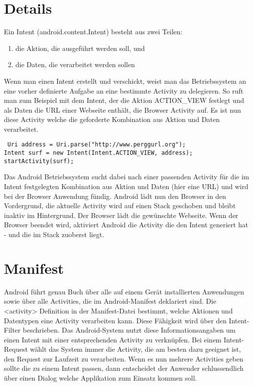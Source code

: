 \documentclass[a4paper,10pt,titlepage=false]{scrreprt}
\begin{document}
\section{Details}
Ein Intent (android.content.Intent) besteht aus zwei Teilen:
\begin{enumerate}


\item die Aktion, die ausgeführt werden soll, und
\item die Daten, die verarbeitet werden sollen
\end{enumerate}
Wenn man einen Intent erstellt und verschickt, weist man das Betriebssystem an eine vorher
definierte Aufgabe an eine bestimmte Activity zu delegieren. So ruft man zum Beispiel mit dem
Intent, der die Aktion ACTION\_VIEW festlegt und als Daten die URL einer Webseite enthält, die
Browser Activity auf. Es ist nun diese Activity welche die geforderte Kombination aus Aktion und
Daten verarbeitet.
\begin{lstlisting}
 Uri address = Uri.parse("http://www.perggurl.org");
Intent surf = new Intent(Intent.ACTION_VIEW, address);
startActivity(surf);
\end{lstlisting}
\begin{framed}
 Das Android Betriebssystem sucht dabei nach einer passenden Activity für die im Intent festgelegten
Kombination aus Aktion und Daten (hier eine URL) und wird bei der Browser Anwendung fündig.
Android lädt nun den Browser in den Vordergrund, die aktuelle Activity wird auf einen Stack
geschoben und bleibt inaktiv im Hintergrund. Der Browser lädt die gewünschte Webseite. Wenn der
Browser beendet wird, aktiviert Android die Activity die den Intent generiert hat - und die im Stack
zuoberst liegt.
\end{framed}

\section{Manifest}
Android führt genau Buch über alle auf einem Gerät installierten Anwendungen sowie über alle
Activities, die im Android-Manifest deklariert sind. Die <activity> Definition in der Manifest-Datei
bestimmt, welche Aktionen und Datentypen eine Activity verarbeiten kann. Diese Fähigkeit wird über
den Intent-Filter beschrieben. Das Android-System nutzt diese Informationsangaben um einen
Intent mit einer entsprechenden Activity zu verknüpfen. Bei einem Intent-Request wählt das System
immer die Activity, die am besten dazu geeignet ist, den Request zur Laufzeit zu verarbeiten. Wenn
es nun mehrere Activities geben sollte die zu einem Intent passen, dann entscheidet der Anwender
schlussendlich über einen Dialog welche Applikation zum Einsatz kommen soll.
\end{document}
